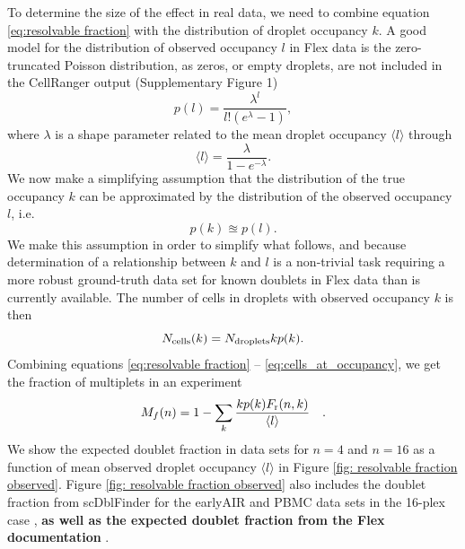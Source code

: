 \documentclass[unnumsec,webpdf,modern,large]{oup-authoring-template}
\begin{document}
	To determine the size of the effect in real data, we need to combine equation \eqref{eq:resolvable fraction} with the distribution of droplet occupancy $k$. 
	A good model for the distribution of observed occupancy $l$ in Flex data is the zero-truncated Poisson distribution, as zeros, or empty droplets, are not included in the CellRanger output (Supplementary Figure 1)
	\begin{equation}
		p(l) = \frac{\lambda^l}{l! (e^{\lambda} - 1)}  ,
		\label{eq: poisson_distribution} 
	\end{equation}
	where $\lambda$ is a shape parameter related to the mean droplet occupancy $\langle l \rangle$ through
	\begin{equation}
		\langle l \rangle = \frac{\lambda}{1 - e^{- \lambda}}  .
		\label{eq: poisson expectation value}
	\end{equation}
	We now make a simplifying assumption that the distribution of the true occupancy $k$ can be approximated by the distribution of the observed occupancy $l$, i.e.
	\begin{equation}
		p(k) \approxeq p(l)  .
		\label{eq:pdf approximation}
	\end{equation}
	We make this assumption in order to simplify what follows, and because determination of a relationship between $k$ and $l$ is a non-trivial task requiring a more robust ground-truth data set for known doublets in Flex data than is currently available. 
	The number of cells in droplets with observed occupancy $k$ is then 
	\begin{equation}
		N_{\rm cells}(k) = N_{\rm droplets} k p(k).
		\label{eq:cells_at_occupancy}
	\end{equation}
	Combining  equations \eqref{eq:resolvable fraction} -- \eqref{eq:cells_at_occupancy}, we get the fraction of multiplets in an experiment 
	\begin{equation}
		M_f(n) = 1 - \sum_k \frac{k p(k) F_{\rm r}(n, k)}{\langle l \rangle} \quad .
		\label{eq:dataset resolvable fraction}
	\end{equation}
	We show the expected doublet fraction in data sets for $n = 4$ and $n = 16$ as a function of mean observed droplet occupancy $\langle l \rangle$ in Figure \ref{fig: resolvable fraction observed}.
	Figure \ref{fig: resolvable fraction observed} also includes the doublet fraction from scDblFinder for the earlyAIR and PBMC data sets in the 16-plex case
	\citep{Germain2021},
	\textbf{as well as the expected doublet fraction from the Flex documentation}
	\citep{10X_flex_protocol}.
\end{document}
